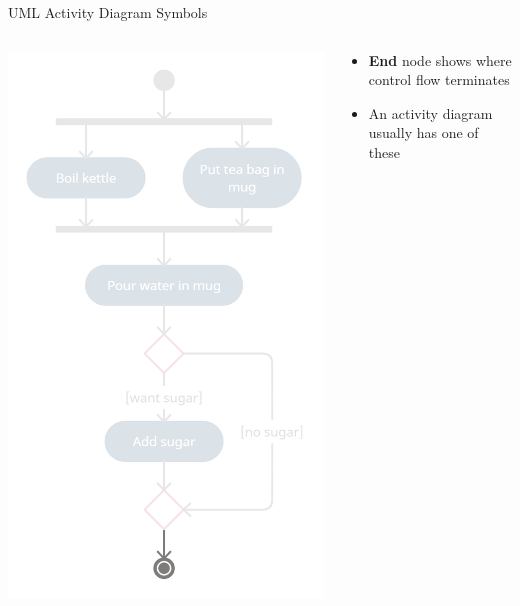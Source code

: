 \begin{frame}{UML Activity Diagram Symbols}
	\begin{columns}
		\begin{column}{0.4\textwidth}
			\includegraphics[width=\textwidth]{ad_end}
		\end{column}
		\begin{column}{0.58\textwidth}
			\begin{itemize}
				\pause\item \textbf{End} node shows where control flow terminates
				\pause\item An activity diagram usually has one of these
			\end{itemize}
		\end{column}
	\end{columns}
\end{frame}

